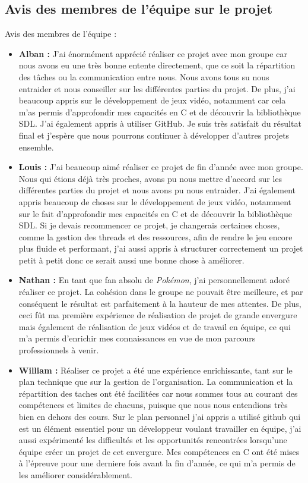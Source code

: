 \documentclass[12pt,a4paper, twoside]{article}
\begin{document}
\subsection{Avis des membres de l'équipe sur le projet}
Avis des membres de l'équipe :
\begin{itemize}
    \item \textbf{Alban :}  J'ai énormément apprécié réaliser ce projet avec mon groupe car nous avons eu une très bonne entente directement, que ce soit la répartition des tâches ou la communication entre nous. Nous avons tous su nous entraider et nous conseiller sur les différentes parties du projet. De plus, j'ai beaucoup appris sur le développement de jeux vidéo, notamment car cela m'as permis d'approfondir mes capacités en C et de découvrir la bibliothèque SDL. J'ai également appris à utiliser GitHub. Je suis très satisfait du résultat final et j'espère que nous pourrons continuer à développer d'autres projets ensemble.
    \newline
    \item \textbf{Louis :} J'ai beaucoup aimé réaliser ce projet de fin d'année avec mon groupe. Nous qui étions déjà très proches, avons pu nous mettre d'accord sur les différentes parties du projet et nous avons pu nous entraider. J'ai également appris beaucoup de choses sur le développement de jeux vidéo, notamment sur le fait d'approfondir mes capacités en C et de découvrir la bibliothèque SDL. Si je devais recommencer ce projet, je changerais certaines choses, comme la gestion des threads et des ressources, afin de rendre le jeu encore plus fluide et performant, j'ai aussi appris à structurer correctement un projet petit à petit donc ce serait aussi une bonne chose à améliorer.
    \newline
    \item \textbf{Nathan :} En tant que fan absolu de \emph{Pokémon}, j'ai personnellement adoré réaliser ce projet. La cohésion dans le groupe ne pouvait être meilleure, et par conséquent le résultat est parfaitement à la hauteur de mes attentes. De plus, ceci fût ma première expérience de réalisation de projet de grande envergure mais également de réalisation de jeux vidéos et de travail en équipe, ce qui m'a permis d'enrichir mes connaissances en vue de mon parcours professionnels à venir.
    \newline
    \item \textbf{William :} Réaliser ce projet a été une expérience enrichissante, tant sur le plan technique que sur la gestion de l'organisation. La communication et la répartition des taches ont été facilitées car nous sommes tous au courant des compétences et limites de chacuns, puisque que nous nous entendions très bien en dehors des cours. Sur le plan personnel j'ai appris a utilisé github qui est un élément essentiel pour un développeur voulant travailler en équipe, j'ai aussi expérimenté les difficultés et les opportunités rencontrées lorsqu'une équipe créer un projet de cet envergure. Mes compétences en C ont été mises à l'épreuve pour une derniere fois avant la fin d'année, ce qui m'a permis de les améliorer considérablement.
    
\end{itemize}
\end{document}
